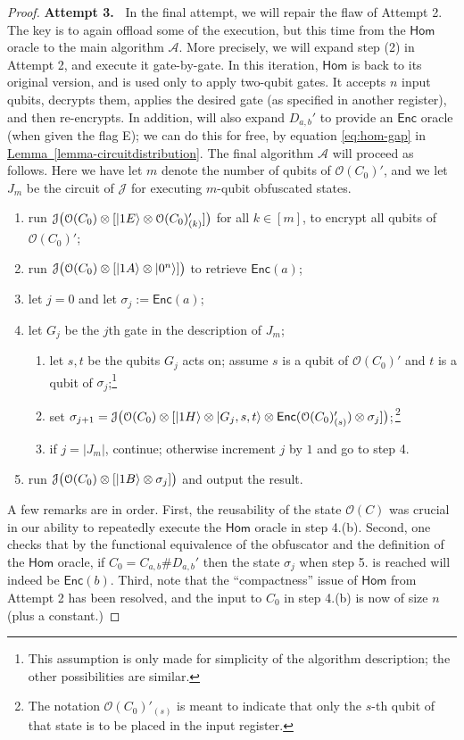 \documentclass[envcountsame]{llncs}
\numberwithin{equation}{section}
\newcommand{\expref}[2]{\texorpdfstring{\hyperref[#2]{#1~\ref{#2}}}{#1~\ref{#2}}}
\newcommand{\algo}{\mathcal}
\newcommand{\Enc}{\ensuremath{\mathsf{Enc}}\xspace}
\newcommand{\Homorcl}{\ensuremath{\mathsf{Hom}}\xspace}
\begin{document}
\begin{proof}
\textbf{Attempt 3.~} In the final attempt, we will repair the flaw of Attempt 2. The key is to again offload some of the execution, but this time from the $\Homorcl$ oracle to the main algorithm $\algo A$. More precisely, we will expand step (2) in Attempt 2, and execute it gate-by-gate. In this iteration, $\Homorcl$ is back to its original version, and is used only to apply two-qubit gates. It accepts $n$ input qubits, decrypts them, applies the desired gate (as specified in another register), and then re-encrypts. In addition, will also expand $D_{a, b}'$ to provide an $\Enc$ oracle (when given the flag E); we can do this for free, by equation \eqref{eq:hom-gap} in \expref{Lemma}{lemma-circuitdistribution}. The final algorithm $\algo A$ will proceed as follows. Here we have let $m$ denote the number of qubits of $\algo O(C_0)'$, and we let $J_m$ be the circuit of $\algo J$ for executing $m$-qubit obfuscated states.
\begin{enumerate}
\item run $\algo J \bigl( \algo O(C_0) \otimes [\ket{1E} \otimes \algo O(C_0)'_{(k)}]\bigr)$ for all $k \in [m]$, to encrypt all qubits of $\algo O(C_0)'$; 
\item run $\algo J \bigl( \algo O(C_0) \otimes [\ket{1A} \otimes \ket{0^n}]\bigr)$ to retrieve $\Enc(a)$;
\item let $j = 0$ and let $\sigma_j := \Enc(a)$;
\item let $G_j$ be the $j$th gate in the description of $J_m$;
\begin{enumerate}
\item let $s, t$ be the qubits $G_j$ acts on; assume $s$ is a qubit of $\algo O(C_0)'$ and $t$ is a qubit of $\sigma_j$;\footnote{This assumption is only made for simplicity of the algorithm description; the other possibilities are similar.}
\item set $\sigma_{j+1} = \algo J \bigl( \algo O(C_0) \otimes [\ket{1H} \otimes \ket{G_j, s, t} \otimes \Enc(\algo O(C_0)'_{(s)}) \otimes \sigma_j]\bigr)$;\,\footnote{The notation $\algo O(C_0)'_{(s)}$ is meant to indicate that only the $s$-th qubit of that state is to be placed in the input register.}
\item if $j = |J_m|$, continue; otherwise increment $j$ by $1$ and go to step 4.
\end{enumerate}
\item run $\algo J \bigl( \algo O(C_0) \otimes [\ket{1B} \otimes \sigma_j]\bigr)$ and output the result.
\end{enumerate}
A few remarks are in order. First, the reusability of the state $\algo O(C)$ was crucial in our ability to repeatedly execute the $\Homorcl$ oracle in step 4.(b). Second, one checks that by the functional equivalence of the obfuscator and the definition of the $\Homorcl$ oracle, if $C_0 = C_{a, b} \# D_{a, b}'$ then the state $\sigma_j$ when step 5. is reached will indeed be $\Enc(b)$. Third, note that the ``compactness'' issue of $\Homorcl$ from Attempt 2 has been resolved, and the input to $C_0$ in step 4.(b) is now of size $n$ (plus a constant.) 


\end{proof}
\end{document}
